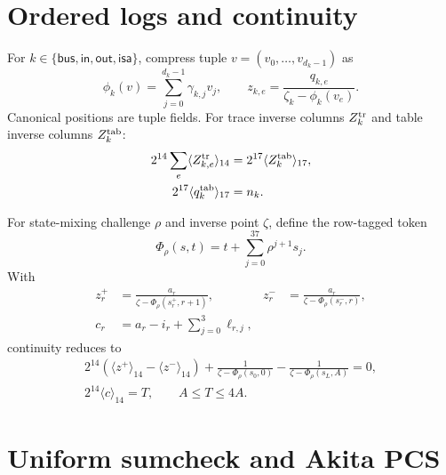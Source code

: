 \documentclass[10pt]{article}
\numberwithin{equation}{section}
\begin{document}
\section{Ordered logs and continuity}

For $k\in\{\mathsf{bus},\mathsf{in},\mathsf{out},\mathsf{isa}\}$, compress tuple
$v=(v_0,\ldots,v_{d_k-1})$ as
\begin{equation}
 \phi_k(v)=\sum_{j=0}^{d_k-1}\gamma_{k,j}v_j,\qquad
 z_{k,e}=\frac{q_{k,e}}{\zeta_k-\phi_k(v_e)}.
\end{equation}
Canonical positions are tuple fields.  For trace inverse columns $Z_k^{\rm tr}$ and table
inverse columns $Z_k^{\rm tab}$:
\begin{align}
 2^{14}\sum_e\langle Z_{k,e}^{\rm tr}\rangle_{14}
 &=2^{17}\langle Z_k^{\rm tab}\rangle_{17},\\
 2^{17}\langle q_k^{\rm tab}\rangle_{17}&=n_k.
 \label{eq:logs}
\end{align}

For state-mixing challenge $\rho$ and inverse point $\zeta$, define the row-tagged token
\begin{equation}
 \Phi_\rho(s,t)=t+\sum_{j=0}^{37}\rho^{j+1}s_j.
\end{equation}
With
\begin{align}
 z_r^+&=\frac{a_r}{\zeta-\Phi_\rho(s_r^+,r+1)},&
 z_r^-&=\frac{a_r}{\zeta-\Phi_\rho(s_r^-,r)},\\
 c_r&=a_r-i_r+\sum_{j=0}^{3}\ell_{r,j},
\end{align}
continuity reduces to
\begin{align}
 \boxed{2^{14}(\langle z^+\rangle_{14}-\langle z^-\rangle_{14})
 +\frac{1}{\zeta-\Phi_\rho(s_0,0)}
 -\frac{1}{\zeta-\Phi_\rho(s_L,A)}=0},\\
 \boxed{2^{14}\langle c\rangle_{14}=T},
 \qquad A\le T\le4A.
 \label{eq:continuity}
\end{align}

\section{Uniform sumcheck and Akita PCS}
\end{document}
